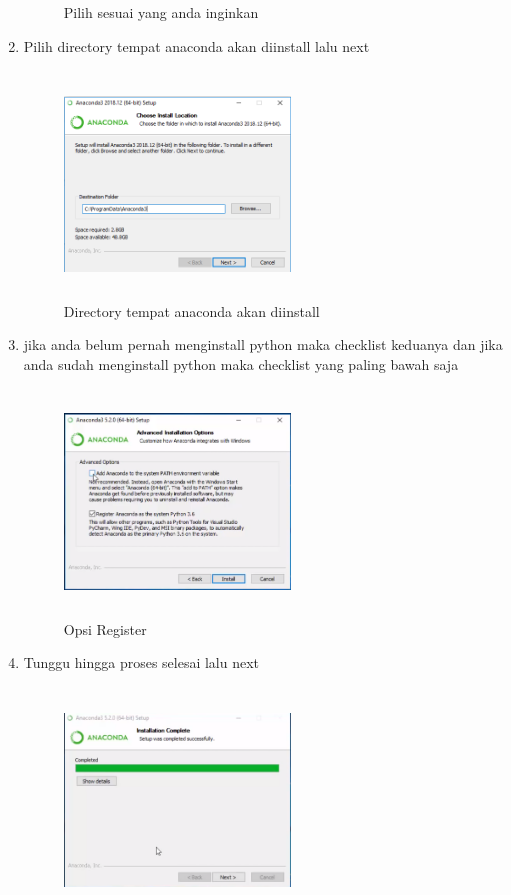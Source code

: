 \begin{enumerate}
\begin{figure}[H]
\caption{Pilih sesuai yang anda inginkan}
\label{akhir}
\end{figure}
\item Pilih directory tempat anaconda akan diinstall lalu next
\begin{figure}[H]
\centering
\includegraphics[width=6cm,height=6cm]{figures/gambar4.png}
\caption{Directory tempat anaconda akan diinstall}
\label{akhir}
\end{figure}
\item jika anda belum pernah menginstall python maka checklist keduanya dan jika anda sudah menginstall python maka checklist yang paling bawah saja
\begin{figure}[!htbp]
\centering
\includegraphics[width=6cm,height=6cm]{figures/gambar5.png}
\caption{Opsi Register}
\label{akhir}
\end{figure}
\item Tunggu hingga proses selesai lalu next
\begin{figure}[H]
\centering
\includegraphics[width=6cm,height=6cm]{figures/gambar6.png}

\end{figure}
\end{enumerate}
